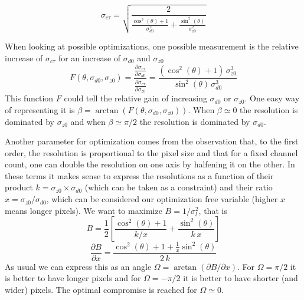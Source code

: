 \documentclass[10pt,a4paper]{article}
\begin{document}
\begin{equation}
\sigma_{c\tau} = \sqrt{ \frac 2 {  \frac {\cos^2(\theta) + 1 } {\sigma_{d0}^2} + 
                                   \frac {\sin^2(\theta)} {\sigma_{z0}^2} } }
\end{equation}

When looking at possible optimizations, one possible measurement is
the relative increase of $\sigma_{c\tau}$ for an increase of $\sigma_{d0}$ and $\sigma_{z0}$
\begin{equation}
F(\theta, \sigma_{d0}, \sigma_{z0}) =
\frac
  {\frac {\partial \sigma_{c\tau}} {\partial \sigma_{d0}} }
  {\frac {\partial \sigma_{c\tau}} {\partial \sigma_{z0}} } = 
\frac
  {(\cos^2(\theta) + 1)\, \sigma^3_{z0}}
  {\sin^2(\theta) \, \sigma^3_{d0}}
\end{equation}
This function $F$ could tell the relative gain of increasing
$\sigma_{d0}$ or $\sigma_{z0}$. One easy way of representing it is
$\beta = \arctan (F(\theta, \sigma_{d0}, \sigma_{z0}) )$. When $\beta
\simeq 0$ the resolution is dominated by $\sigma_{z0}$ and when $\beta
\simeq \pi/2$ the resolution is dominated by $\sigma_{d0}$.

Another parameter for optimization comes from the observation that, to
the first order, the resolution is proportional to the pixel size and
that for a fixed channel count, one can double the resolution on one
axis by halfening it on the other. In these terms it makes sense to
express the resolutions as a function of their product
$k=\sigma_{z0}\times\sigma_{d0}$ (which can be taken as a constraint)
and their ratio $x=\sigma_{z0}/\sigma_{d0}$, which can be
considered our optimization free variable (higher $x$ means longer pixels). We want to maximize
$B=1/\sigma^2_l$, that is
\begin{equation}
  B = \frac 1 2 \left [ \frac {\cos^2(\theta)+1} {k/x} + \frac {\sin^2(\theta)} {k\,x} \right ]
\end{equation}
\begin{equation}
 \frac { \partial B } {\partial x} = \frac { \cos^2(\theta) + 1 + \frac 1 x \sin^2(\theta) } {2\,k}
\end{equation}
As usual we can express this as an angle $\Omega=\arctan(\partial B /
\partial x)$. For $\Omega = \pi/2$ it is better to have longer pixels
and for $\Omega = -\pi/2$ it is better to have shorter (and wider)
pixels. The optimal compromise is reached for $\Omega \simeq 0$.


\label{LastPage}
\end{document}
